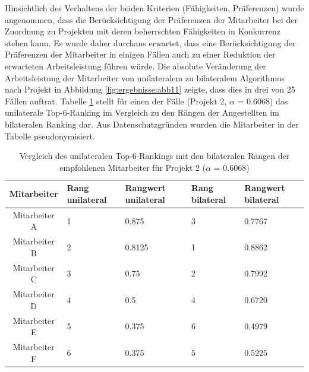 Hinsichtlich des Verhaltens der beiden Kriterien (Fähigkeiten, Präferenzen) wurde angenommen, dass die Berücksichtigung der Präferenzen der Mitarbeiter bei der Zuordnung zu Projekten mit deren beherrschten Fähigkeiten in Konkurrenz stehen kann.
Es wurde daher durchaus erwartet, dass eine Berücksichtigung der Präferenzen der Mitarbeiter in einigen Fällen auch zu einer Reduktion der erwarteten Arbeitsleistung führen würde.
Die absolute Veränderung der Arbeitsleistung der Mitarbeiter von unilateralem zu bilateralem Algorithmus nach Projekt in Abbildung \ref{fig:ergebnisse:abb11} zeigte, dass dies in drei von 25 Fällen auftrat.
Tabelle \ref{tab:diskussion:tab2} stellt für einen der Fälle (Projekt 2, $\alpha$ = 0.6068) das unilaterale Top-6-Ranking im Vergleich zu den Rängen der Angestellten im bilateralen Ranking dar.
Aus Datenschutzgründen wurden die Mitarbeiter in der Tabelle pseudonymisiert.

\begin{table}[htbp]
    \begin{center}
    \begin{tabular}{c|p{0.7in}|p{0.7in}|p{0.7in}|p{0.7in}}
    {\textbf{Mitarbeiter}} & {\textbf{Rang unilateral}} & {\textbf{Rangwert unilateral}} & {\textbf{Rang bilateral}} & {\textbf{Rangwert bilateral}} \\
    \hline
	Mitarbeiter A & \hfil1 & \hfil0.875 & \hfil3 & \hfil0.7767 \\
    \hline
    Mitarbeiter B & \hfil2 & \hfil0.8125 & \hfil1 & \hfil0.8862 \\
    \hline
	Mitarbeiter C & \hfil3 & \hfil0.75 & \hfil2 & \hfil0.7992 \\
    \hline
	Mitarbeiter D & \hfil4 & \hfil0.5 & \hfil4 & \hfil0.6720 \\
    \hline
	Mitarbeiter E & \hfil5 & \hfil0.375 & \hfil6 & \hfil0.4979 \\
    \hline
	Mitarbeiter F & \hfil6 & \hfil0.375 & \hfil5 & \hfil0.5225 \\
    \end{tabular}
    \end{center}
    \caption[Vergleich des unilateralen Top-6-Rankings mit den bilateralen Rängen der empfohlenen Mitarbeiter für Projekt 2 ($\alpha$ = 0.6068)]{Vergleich des unilateralen Top-6-Rankings mit den bilateralen Rängen der empfohlenen Mitarbeiter für Projekt 2 ($\alpha$ = 0.6068)}
	\label{tab:diskussion:tab2}
\end{table}


